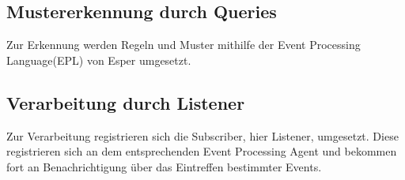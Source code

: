 \subsection{Mustererkennung durch Queries}

Zur Erkennung werden Regeln und Muster mithilfe der Event Processing Language(EPL) von Esper umgesetzt.

\subsection{Verarbeitung durch Listener}

Zur Verarbeitung registrieren sich die Subscriber, hier Listener, umgesetzt. Diese registrieren sich an dem entsprechenden Event Processing Agent und bekommen fort an Benachrichtigung über das Eintreffen bestimmter Events.

